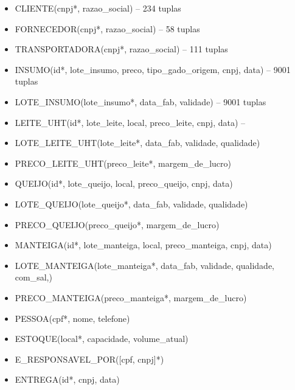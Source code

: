\documentclass[11pt]{article}
\begin{document}
\begin{itemize}
	\item CLIENTE(cnpj*, razao\_social) -- 234 tuplas
	\item FORNECEDOR(cnpj*, razao\_social) -- 58 tuplas
	\item TRANSPORTADORA(cnpj*, razao\_social) -- 111 tuplas

	\item INSUMO(id*, lote\_insumo, preco, tipo\_gado\_origem, cnpj, data) 
		-- 9001 tuplas
	\item LOTE\_INSUMO(lote\_insumo*, data\_fab, validade) -- 9001 tuplas

	\item LEITE\_UHT(id*, lote\_leite, local, preco\_leite, cnpj, data) -- 
	\item LOTE\_LEITE\_UHT(lote\_leite*, data\_fab, validade,  qualidade)
	\item PRECO\_LEITE\_UHT(preco\_leite*, margem\_de\_lucro)

	\item QUEIJO(id*, lote\_queijo, local, preco\_queijo, cnpj, data)
	\item LOTE\_QUEIJO(lote\_queijo*, data\_fab, validade,  qualidade)
	\item PRECO\_QUEIJO(preco\_queijo*, margem\_de\_lucro)

	\item MANTEIGA(id*, lote\_manteiga, local, preco\_manteiga, cnpj, data)
	\item LOTE\_MANTEIGA(lote\_manteiga*, data\_fab, validade,  qualidade, com\_sal,)
	\item PRECO\_MANTEIGA(preco\_manteiga*, margem\_de\_lucro)

	\item PESSOA(cpf*, nome, telefone)

	\item ESTOQUE(local*, capacidade, volume\_atual)

	\item E\_RESPONSAVEL\_POR([cpf, cnpj]*)
	\item ENTREGA(id*, cnpj, data)
\end{itemize}
\end{document}
